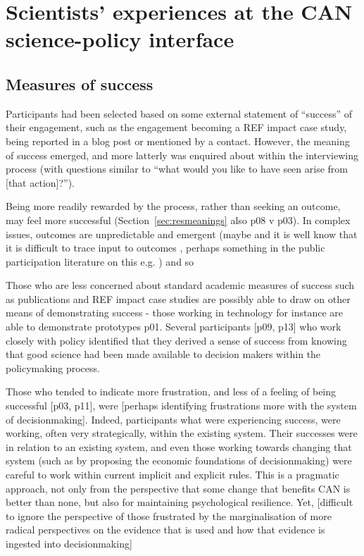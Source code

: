 \section{Scientists' experiences at the CAN science-policy interface}\label{sec:disexperience}
\subsection{Measures of success}
Participants had been selected based on some external statement of ``success'' of their engagement, such as the engagement becoming a REF impact case study, being reported in a blog post or mentioned by a contact. However, the meaning of success emerged, and more latterly was enquired about within the interviewing process (with questions similar to ``what would you like to have seen arise from [that action]?'').

Being more readily rewarded by the process, rather than seeking an outcome, may feel more successful (Section~\ref{sec:resmeanings} also p08 v p03). In complex issues, outcomes are unpredictable and emergent (maybe \cite{SnowdenB2007} and it is well know that it is difficult to trace input to outcomes \cite{BednarekSHG2015}, perhaps something in the public participation literature on this e.g. \cite{Sprain2016}) and so 

Those who are less concerned about standard academic measures of success such as publications and REF impact case studies are possibly able to draw on other means of demonstrating success - those working in technology for instance are able to demonstrate prototypes p01. Several participants [p09, p13] who work closely with policy identified that they derived a sense of success from knowing that good science had been made available to decision makers within the policymaking process.

Those who tended to indicate more frustration, and less of a feeling of being successful [p03, p11], were [perhaps identifying frustrations more with the system of decisionmaking]. Indeed, participants what were experiencing success, were working, often very strategically, within the existing system. Their successes were in relation to an existing system, and even those working towards changing that system (such as by proposing the economic foundations of decisionmaking) were careful to work within current implicit and explicit rules. This is a pragmatic approach, not only from the perspective that some change that benefits CAN is better than none, but also for maintaining psychological resilience. Yet, [difficult to ignore the perspective of those frustrated by the marginalisation of more radical perspectives on the evidence that is used and how that evidence is ingested into decisionmaking]  

